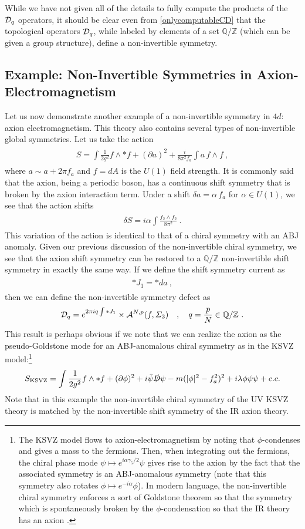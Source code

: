 \documentclass[11pt]{article}
\newcommand{\eq}[1]{\begin{align}\begin{split}#1\end{split}\end{align}}
\def\CA{{\cal A}}
\def\CD {{\cal D}}
\def\IQ{\mathbb{Q}}
\def\IZ{{\mathbb{Z}}}
\begin{document}
While we have not given all of the details to fully compute the products of the $\CD_q$ operators, it should be clear even from \eqref{onlycomputableCD} that the topological operators $\CD_q$, while labeled by elements of a set $\IQ/\IZ$ (which can be given a group structure), define a non-invertible symmetry. 

\subsection{Example: Non-Invertible Symmetries in Axion-Electromagnetism}

Let us now demonstrate another example of a non-invertible symmetry in $4d$: axion electromagnetism. 
This theory also  contains several types of non-invertible global symmetries. 
Let us take the action 
\eq{
S=\int \frac{1}{2g^2}f\wedge \ast f+(\partial a)^2+\frac{i}{8\pi^2 f_a}\int a\,f\wedge f~,
}
where $a\sim a+2\pi f_a$ and $f=dA$ is the $U(1)$ field strength. It is commonly said that the axion, being a periodic boson, has a continuous shift symmetry that is broken by the axion interaction term. Under a shift $\delta a=\alpha\, f_a$ for $\alpha\in U(1)$, we see that the action shifts
\eq{
\delta S=i \alpha \int \frac{f_2\wedge f_2}{8\pi^2}~. 
}
This variation of the action is identical to that of a chiral symmetry with an ABJ anomaly. 
Given our previous discussion of the non-invertible chiral symmetry, we see that the axion shift symmetry can be restored to a $\IQ/\IZ$ non-invertible shift symmetry in exactly the same way. If we define the shift symmetry current as 
\eq{
\ast J_1=\ast da~,
}
then we can define the non-invertible symmetry defect as 
\eq{
\CD_q=e^{ 2\pi i q\int \ast J_1}\times  \CA^{N,p}(f,\Sigma_3)\quad, \quad q=\frac{p}{N}\in \IQ/\IZ~.
}
This result is perhaps obvious if we note that we can realize the axion as the pseudo-Goldstone mode for an ABJ-anomalous chiral symmetry as in the KSVZ model:\footnote{
The KSVZ model flows to axion-electromagnetism by noting that $\phi$-condenses and gives a mass to the fermions. Then, when integrating out the fermions, the chiral phase mode $\psi\mapsto e^{i \alpha \gamma_5/2}\psi$ gives rise to the axion by the fact that the associated symmetry is an ABJ-anomalous symmetry (note that this symmetry also rotates $\phi\mapsto e^{-i \alpha}\phi$). In modern language, the non-invertible chiral symmetry enforces a sort of Goldstone theorem so that the symmetry which is spontaneously broken by the $\phi$-condensation so that the IR theory has an axion \cite{GarciaEtxebarria:2022jky}. 
}
\eq{
S_{\rm KSVZ}=\int \frac{1}{2g^2}f\wedge \ast f+(\partial \phi)^2+i \bar\psi\slashed{D}\psi-m(|\phi|^2-f_a^2)^2+ i\lambda \phi \psi \psi+c.c.
}
Note that in this example the non-invertible chiral symmetry of the UV KSVZ theory is matched by the non-invertible shift symmetry of the IR axion theory. 
\end{document}
